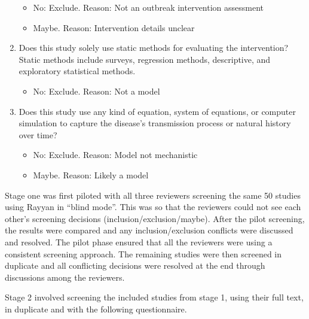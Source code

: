 \documentclass[10pt,letterpaper]{article}
\begin{document}
\begin{enumerate}
	\begin{itemize}
		\item 	No: Exclude. Reason: Not an outbreak intervention assessment
		\item 	Maybe. Reason: Intervention details unclear
	\end{itemize}
	\item Does this study solely use static methods for evaluating the intervention? Static methods include surveys, regression methods, descriptive, and exploratory statistical methods.
	\begin{itemize}
		\item 	No: Exclude. Reason: Not a model
	\end{itemize}
	\item Does this study use any kind of equation, system of equations, or computer simulation to capture the disease’s transmission process or natural history over time?
	\begin{itemize}
		\item 	No: Exclude. Reason: Model not mechanistic
		\item 	Maybe. Reason: Likely a model
	\end{itemize}
\end{enumerate}

Stage one was first piloted with all three reviewers screening the same 50 studies using Rayyan in ``blind mode''. This was so that the reviewers could not see each other's screening decisions (inclusion/exclusion/maybe). After the pilot screening, the results were compared and any inclusion/exclusion conflicts were discussed and resolved. The pilot phase ensured that all the reviewers were using a consistent screening approach. The remaining studies were then screened in duplicate and all conflicting decisions were resolved at the end through discussions among the reviewers. 

Stage 2 involved screening the included studies from stage 1, using their full text, in duplicate and with the following questionnaire.
\end{document}
